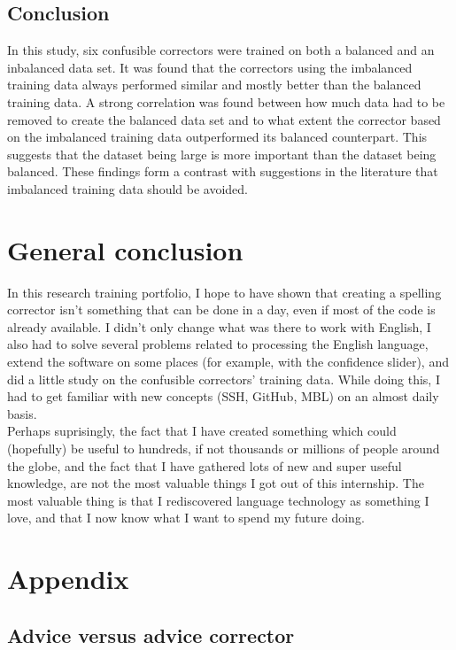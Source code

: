 \documentclass[12pt]{article}
\let\stdsection\section
\renewcommand\section{\newpage\stdsection}
\begin{document}
\subsection{Conclusion}
In this study, six confusible correctors were trained on both a balanced and an inbalanced data set. It was found that the correctors using the imbalanced training data always performed similar and mostly better than the balanced training data. A strong correlation was found between how much data had to be removed to create the balanced data set and to what extent the corrector based on the imbalanced training data outperformed its balanced counterpart. This suggests that the dataset being large is more important than the dataset being balanced. These findings form a contrast with suggestions in the literature that imbalanced training data should be avoided.

\section{General conclusion}
In this research training portfolio, I hope to have shown that creating a spelling corrector isn't something that can be done in a day, even if most of the code is already available. I didn't only change what was there to work with English, I also had to solve several problems related to processing the English language, extend the software on some places (for example, with the confidence slider), and did a little study on the confusible correctors' training data. While doing this, I had to get familiar with new concepts (SSH, GitHub, MBL) on an almost daily basis.\\\indent
Perhaps suprisingly, the fact that I have created something which could (hopefully) be useful to hundreds, if not thousands or millions of people around the globe, and the fact that I have gathered lots of new and super useful knowledge, are not the most valuable things I got out of this internship. The most valuable thing is that I rediscovered language technology as something I love, and that I now know what I want to spend my future doing.

\section{Appendix}

\subsection{Advice versus advice corrector}
\end{document}

